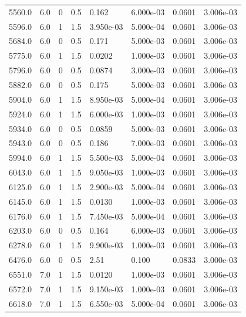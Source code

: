 \documentclass[preview]{standalone}
\begin{document}
{{{{\begin{tabular}{L{1.2cm}C{1.2cm} C{0.3cm}C{0.5cm} C{1.4cm}C{1.4cm} C{1.4cm}C{1.4cm}}
  5560.0  &   6.0  & 0     & 0.5 &  0.162  & 6.000e-03  & 0.0601 &  3.006e-03   \\ 
  5596.0  &   6.0  & 1     & 1.5 &  3.950e-03  & 5.000e-04  & 0.0601 &  3.006e-03   \\ 
  5684.0  &   6.0  & 0     & 0.5 &  0.171  & 5.000e-03  & 0.0601 &  3.006e-03   \\ 
  5775.0  &   6.0  & 1     & 1.5 &  0.0202  & 1.000e-03  & 0.0601 &  3.006e-03   \\ 
  5796.0  &   6.0  & 0     & 0.5 &  0.0874  & 3.000e-03  & 0.0601 &  3.006e-03   \\ 
  5882.0  &   6.0  & 0     & 0.5 &  0.175  & 5.000e-03  & 0.0601 &  3.006e-03   \\ 
  5904.0  &   6.0  & 1     & 1.5 &  8.950e-03  & 5.000e-04  & 0.0601 &  3.006e-03   \\ 
  5924.0  &   6.0  & 1     & 1.5 &  6.000e-03  & 1.000e-03  & 0.0601 &  3.006e-03   \\ 
  5934.0  &   6.0  & 0     & 0.5 &  0.0859  & 5.000e-03  & 0.0601 &  3.006e-03   \\ 
  5943.0  &   6.0  & 0     & 0.5 &  0.186  & 7.000e-03  & 0.0601 &  3.006e-03   \\ 
  5994.0  &   6.0  & 1     & 1.5 &  5.500e-03  & 5.000e-04  & 0.0601 &  3.006e-03   \\ 
  6043.0  &   6.0  & 1     & 1.5 &  9.050e-03  & 1.000e-03  & 0.0601 &  3.006e-03   \\ 
  6125.0  &   6.0  & 1     & 1.5 &  2.900e-03  & 5.000e-04  & 0.0601 &  3.006e-03   \\ 
  6145.0  &   6.0  & 1     & 1.5 &  0.0130  & 1.000e-03  & 0.0601 &  3.006e-03   \\ 
  6176.0  &   6.0  & 1     & 1.5 &  7.450e-03  & 5.000e-04  & 0.0601 &  3.006e-03   \\ 
  6203.0  &   6.0  & 0     & 0.5 &  0.164  & 6.000e-03  & 0.0601 &  3.006e-03   \\ 
  6278.0  &   6.0  & 1     & 1.5 &  9.900e-03  & 1.000e-03  & 0.0601 &  3.006e-03   \\ 
  6476.0  &   6.0  & 0     & 0.5 &  2.51  & 0.100  & 0.0833 &  3.000e-03   \\ 
  6551.0  &   7.0  & 1     & 1.5 &  0.0120  & 1.000e-03  & 0.0601 &  3.006e-03   \\ 
  6572.0  &   7.0  & 1     & 1.5 &  9.150e-03  & 1.000e-03  & 0.0601 &  3.006e-03   \\ 
  6618.0  &   7.0  & 1     & 1.5 &  6.550e-03  & 5.000e-04  & 0.0601 &  3.006e-03   \\ 

\end{tabular}}}}}
\end{document}
